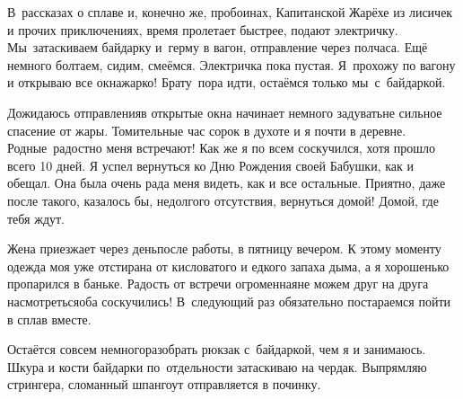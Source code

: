 В~рассказах о сплаве и, конечно же, пробоинах, Капитанской Жарёхе из лисичек и прочих приключениях, время пролетает быстрее, подают электричку. Мы~затаскиваем байдарку и~герму в вагон, отправление через полчаса. Ещё немного болтаем, сидим, смеёмся. Электричка пока пустая. Я~прохожу по вагону и открываю все окна\mdash жарко! Брату~пора идти, остаёмся только мы~с~байдаркой. 

Дожидаюсь отправления\mdash в открытые окна начинает немного задувать\mdash не сильное спасение от жары. Томительные час сорок в духоте и я почти в деревне. Родные~радостно меня встречают! Как же я по всем соскучился, хотя прошло всего 10 дней. Я успел вернуться ко Дню Рождения своей Бабушки, как и обещал. Она была очень рада меня видеть, как и все остальные. Приятно, даже после такого, казалось бы, недолгого отсутствия, вернуться домой! Домой, где тебя ждут. 

Жена приезжает через день\mdash после работы, в пятницу вечером. К этому моменту одежда моя уже отстирана от кисловатого и едкого запаха дыма, а я хорошенько пропарился в баньке. Радость от встречи огроменная\mdash не можем друг на друга насмотреться\mdash оба соскучились! В~следующий раз обязательно постараемся пойти в сплав вместе. 

Остаётся совсем немного\mdash разобрать рюкзак с~байдаркой, чем я и занимаюсь. Шкура и кости байдарки по~отдельности затаскиваю на чердак. Выпрямляю стрингера, сломанный шпангоут отправляется в починку. 

\begin{center}
\end{center}
